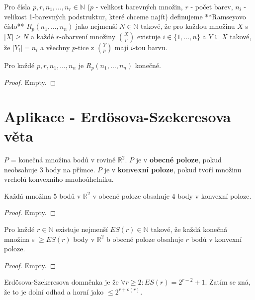 \begin{definice}
	Pro čísla $p,r,n_{1}, \dots , n_{r} \in \mathbb{N}$ ($p$ - velikost barevných množin, $r$ - počet barev, $n_{i}$ - velikost 1-barevných podstruktur, které chceme najít) definujeme **Ramseyovo číslo** $R_{p}(n_{1}, \dots , n_{n})$ jako nejmenší $N \in \mathbb{N}$ takové, že pro každou množinu $X$ s $|X| \geq N$ a každé $r$-obarvení množiny $\binom{X}{p}$ existuje $i \in \{ 1, \dots , n \}$ a $Y \subseteq X$ takové, že $|Y_{i}| = n_{i}$ a všechny $p$-tice z $\binom{Y}{p}$ mají $i$-tou barvu.
\end{definice}

\begin{veta}
	Pro každé $p,r,n_{1}, \dots , n_{n}$ je $R_{p}(n_{1}, \dots , n_{n})$ konečné.
\end{veta}

\begin{proof}
	Empty.
\end{proof}

\section{Aplikace - Erdösova-Szekeresova věta}

\begin{definice}
	$P$ = konečná množina bodů v rovině $\mathbb{R}^{2}$. $P$ je v \textbf{obecné poloze}, pokud neobsahuje 3 body na přímce. $P$ je v \textbf{konvexní poloze}, pokud tvoří množinu vrcholů konvexního mnohoúhelníku.
\end{definice}

\begin{lemma}
	Každá množina 5 bodů v $\mathbb{R}^{2}$ v obecné poloze obsahuje 4 body v konvexní poloze.
\end{lemma}

\begin{proof}
	Empty.
\end{proof}

\begin{veta}
	Pro každé $r \in \mathbb{N}$ existuje nejmenší $ES(r) \in \mathbb{N}$ takové, že každá konečná množina s $\geq ES(r)$ body v $\mathbb{R}^{2}$ b obecné poloze obsahuje $r$ bodů v konvexní poloze.
\end{veta}

\begin{proof}
	Empty.
\end{proof}

Erdösova-Szekeresova domněnka je že $\forall r \geq 2: ES(r) = 2^{r-2}+1$. Zatím se zná, že to je dolní odhad a horní jako $\leq 2^{r+o(r)}$.

